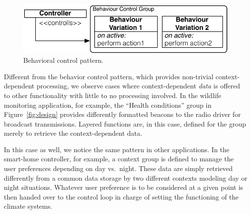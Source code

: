 \begin{figure}
\begin{center}
\includegraphics[scale=.43]{imgs/beh_var}
\vspace{-1mm}
\caption{Behavioral control pattern.}
  \label{fig:control}
\vspace{-8mm}
\end{center}
\end{figure}




 Different from the behavior control
pattern, which provides non-trivial context-dependent processing, we
observe cases where context-dependent \emph{data} is offered to other
functionality with little to no processing involved. In the wildlife
monitoring application, for example, the ``Health conditions'' group
in Figure~\ref{fig:design} provides differently formatted beacons to
the radio driver for broadcast transmissions. Layered functions are,
in this case, defined for the group merely to retrieve the
context-dependent data.

In this case as well, we notice the same pattern in other
applications. In the smart-home controller, for example, a context
group is defined to manage the user preferences depending on day vs.\
night. These data are simply retrieved differently from a common data
storage by two different contexts modeling day or night
situations. Whatever user preference is to be considered at a given
point is then handed over to the control loop in charge of setting the
functioning of the climate systems.

